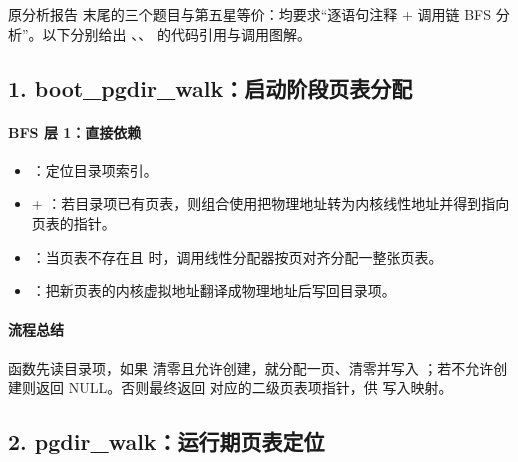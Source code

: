 \documentclass[12pt,oneside]{ctexbook}
\begin{document}
原分析报告 末尾的三个题目与第五星等价：均要求“逐语句注释 + 调用链 BFS 分析”。以下分别给出 、、 的代码引用与调用图解。

\subsection*{1. boot\_pgdir\_walk：启动阶段页表分配}

\paragraph{BFS 层 1：直接依赖}
\begin{itemize}
    \item {}：定位目录项索引。
    \item {} + ：若目录项已有页表，则组合使用把物理地址转为内核线性地址并得到指向页表的指针。
    \item {}：当页表不存在且  时，调用线性分配器按页对齐分配一整张页表。
    \item {}：把新页表的内核虚拟地址翻译成物理地址后写回目录项。
\end{itemize}

\paragraph{流程总结}
函数先读目录项，如果  清零且允许创建，就分配一页、清零并写入 ；若不允许创建则返回 NULL。否则最终返回  对应的二级页表项指针，供  写入映射。

\subsection*{2. pgdir\_walk：运行期页表定位}
\end{document}
